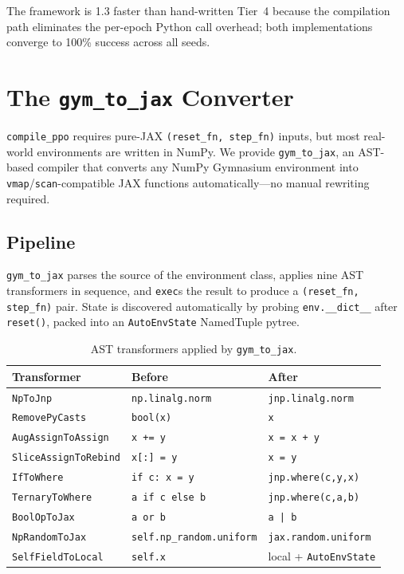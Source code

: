 \documentclass[11pt,twocolumn]{article}
\begin{document}
The framework is 1.3\texttimes{} faster than hand-written Tier~4 because the
compilation path eliminates the per-epoch Python call overhead; both
implementations converge to 100\% success across all seeds.

\section{The \texttt{gym\_to\_jax} Converter}
\label{sec:gym_to_jax}

\texttt{compile\_ppo} requires pure-JAX \texttt{(reset\_fn, step\_fn)} inputs,
but most real-world environments are written in NumPy.  We provide
\texttt{gym\_to\_jax}, an AST-based compiler that converts any NumPy
Gymnasium environment into \texttt{vmap}/\texttt{scan}-compatible JAX
functions automatically—no manual rewriting required.

\subsection{Pipeline}

\texttt{gym\_to\_jax} parses the source of the environment class, applies nine
AST transformers in sequence, and \texttt{exec}s the result to produce a
\texttt{(reset\_fn, step\_fn)} pair.  State is discovered automatically by
probing \texttt{env.\_\_dict\_\_} after \texttt{reset()}, packed into an
\texttt{AutoEnvState} NamedTuple pytree.

\begin{table}[H]
\centering
\footnotesize
\caption{AST transformers applied by \texttt{gym\_to\_jax}.}
\label{tab:transformers}
\begin{tabular}{lll}
\toprule
Transformer & Before & After \\
\midrule
\texttt{NpToJnp}          & \texttt{np.linalg.norm} & \texttt{jnp.linalg.norm} \\
\texttt{RemovePyCasts}    & \texttt{bool(x)}        & \texttt{x} \\
\texttt{AugAssignToAssign}& \texttt{x += y}         & \texttt{x = x + y} \\
\texttt{SliceAssignToRebind}& \texttt{x[:] = y}     & \texttt{x = y} \\
\texttt{IfToWhere}        & \texttt{if c: x = y}    & \texttt{jnp.where(c,y,x)} \\
\texttt{TernaryToWhere}   & \texttt{a if c else b}  & \texttt{jnp.where(c,a,b)} \\
\texttt{BoolOpToJax}      & \texttt{a or b}         & \texttt{a | b} \\
\texttt{NpRandomToJax}    & \texttt{self.np\_random.uniform} & \texttt{jax.random.uniform} \\
\texttt{SelfFieldToLocal} & \texttt{self.x}         & local + \texttt{AutoEnvState} \\
\bottomrule
\end{tabular}
\end{table}
\end{document}
